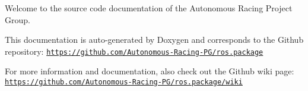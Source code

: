 Welcome to the source code documentation of the Autonomous Racing Project Group.

This documentation is auto-\/generated by Doxygen and corresponds to the Github repository\+: \href{https://github.com/Autonomous-Racing-PG/ros.package}{\tt https\+://github.\+com/\+Autonomous-\/\+Racing-\/\+P\+G/ros.\+package}

For more information and documentation, also check out the Github wiki page\+: \href{https://github.com/Autonomous-Racing-PG/ros.package/wiki}{\tt https\+://github.\+com/\+Autonomous-\/\+Racing-\/\+P\+G/ros.\+package/wiki} 